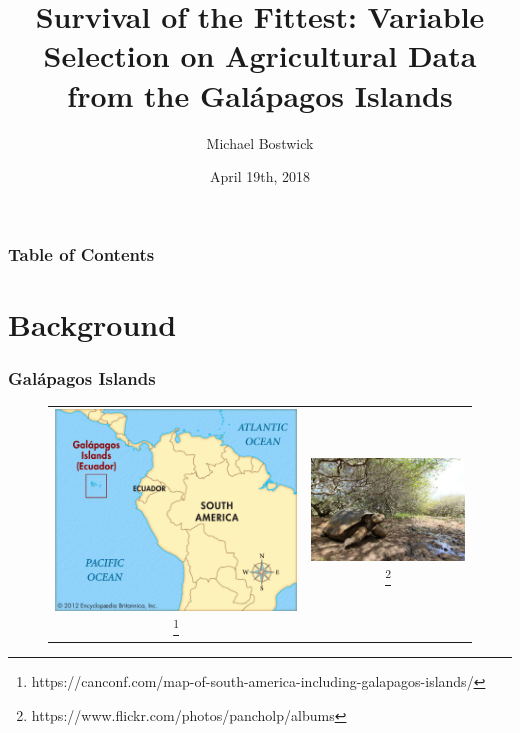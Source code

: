 \documentclass{beamer}
\title[Survival of the Fittest]
{Survival of the Fittest: Variable Selection on Agricultural Data from the Gal\'apagos Islands}
\author
{Michael Bostwick}
\date
{April 19th, 2018}
\begin{document}
 
\frame{\titlepage}

\begin{frame}
\frametitle{Table of Contents}
\tableofcontents
\end{frame}
 
\section{Background}

\begin{frame}
\frametitle{Gal\'apagos Islands}
\begin{figure}
\begin{tabular}{cc}
 \includegraphics[scale=0.09]{galapagosmap} \footnote{https://canconf.com/map-of-south-america-including-galapagos-islands/} &   \includegraphics[scale=0.2]{turtle} \footnote{https://www.flickr.com/photos/pancholp/albums} \\

\end{tabular}
\end{figure}
\end{frame}
\end{document}
